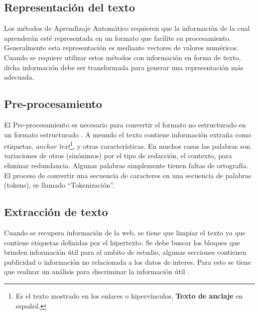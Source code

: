 \subsection[Representación del T]{Representación del texto}
Los métodos de Aprendizaje Automático requieren que la información de la cual aprenderán esté representada en un
formato que facilite su procesamiento. Generalmente esta representación es mediante vectores de valores numéricos. 
Cuando se requiere utilizar estos métodos con información en forma de texto, dicha
información debe ser transformada para generar una representación más adecuada. 



\subsection[Pre-procesamiento]{Pre-procesamiento}

El Pre-procesamiento es necesario para convertir el formato no estructurado en un formato estructurado \citep{CD1}.
A menudo el texto contiene información extraña como etiquetas, \textit{anchor text}\footnote{Es el texto mostrado en los enlaces o hipervínculos, \textbf{Texto de anclaje} en español.}, y otras características. En muchos casos las palabras son variaciones de otros (sinónimos) por el tipo de redacción, el contexto, para eliminar redundancia. Algunas palabras simplemente tienen faltas de ortografía. El proceso de convertir una secuencia de caracteres en una secuencia de palabras (tokens), es llamado ``Tokenización''.


\subsection{Extracción de texto}

Cuando se recupera  información de la web, se tiene que limpiar el texto ya que contiene etiquetas definidas por el hipertexto. Se debe buscar los bloques que brinden información útil para el ambito de estudio, algunas secciones contienen publicidad o información no relacionada a los datos de interes. Para esto se tiene que realizar un análisis para discriminar la información útil \citep{CD1}.




